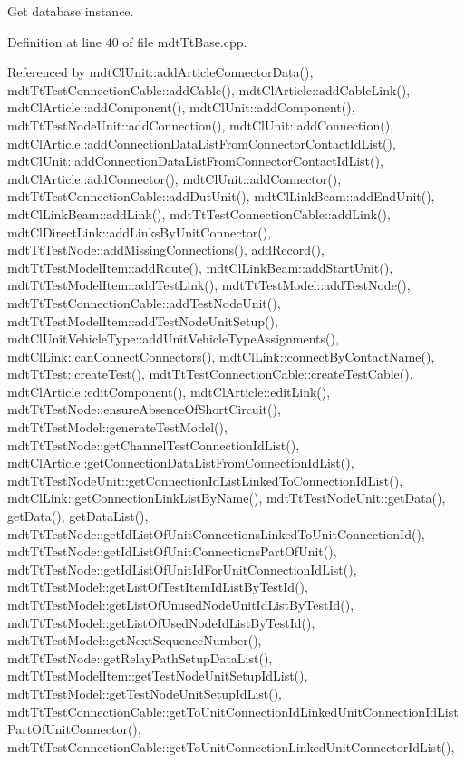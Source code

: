 Get database instance. 



Definition at line 40 of file mdt\-Tt\-Base.\-cpp.



Referenced by mdt\-Cl\-Unit\-::add\-Article\-Connector\-Data(), mdt\-Tt\-Test\-Connection\-Cable\-::add\-Cable(), mdt\-Cl\-Article\-::add\-Cable\-Link(), mdt\-Cl\-Article\-::add\-Component(), mdt\-Cl\-Unit\-::add\-Component(), mdt\-Tt\-Test\-Node\-Unit\-::add\-Connection(), mdt\-Cl\-Unit\-::add\-Connection(), mdt\-Cl\-Article\-::add\-Connection\-Data\-List\-From\-Connector\-Contact\-Id\-List(), mdt\-Cl\-Unit\-::add\-Connection\-Data\-List\-From\-Connector\-Contact\-Id\-List(), mdt\-Cl\-Article\-::add\-Connector(), mdt\-Cl\-Unit\-::add\-Connector(), mdt\-Tt\-Test\-Connection\-Cable\-::add\-Dut\-Unit(), mdt\-Cl\-Link\-Beam\-::add\-End\-Unit(), mdt\-Cl\-Link\-Beam\-::add\-Link(), mdt\-Tt\-Test\-Connection\-Cable\-::add\-Link(), mdt\-Cl\-Direct\-Link\-::add\-Links\-By\-Unit\-Connector(), mdt\-Tt\-Test\-Node\-::add\-Missing\-Connections(), add\-Record(), mdt\-Tt\-Test\-Model\-Item\-::add\-Route(), mdt\-Cl\-Link\-Beam\-::add\-Start\-Unit(), mdt\-Tt\-Test\-Model\-Item\-::add\-Test\-Link(), mdt\-Tt\-Test\-Model\-::add\-Test\-Node(), mdt\-Tt\-Test\-Connection\-Cable\-::add\-Test\-Node\-Unit(), mdt\-Tt\-Test\-Model\-Item\-::add\-Test\-Node\-Unit\-Setup(), mdt\-Cl\-Unit\-Vehicle\-Type\-::add\-Unit\-Vehicle\-Type\-Assignments(), mdt\-Cl\-Link\-::can\-Connect\-Connectors(), mdt\-Cl\-Link\-::connect\-By\-Contact\-Name(), mdt\-Tt\-Test\-::create\-Test(), mdt\-Tt\-Test\-Connection\-Cable\-::create\-Test\-Cable(), mdt\-Cl\-Article\-::edit\-Component(), mdt\-Cl\-Article\-::edit\-Link(), mdt\-Tt\-Test\-Node\-::ensure\-Absence\-Of\-Short\-Circuit(), mdt\-Tt\-Test\-Model\-::generate\-Test\-Model(), mdt\-Tt\-Test\-Node\-::get\-Channel\-Test\-Connection\-Id\-List(), mdt\-Cl\-Article\-::get\-Connection\-Data\-List\-From\-Connection\-Id\-List(), mdt\-Tt\-Test\-Node\-Unit\-::get\-Connection\-Id\-List\-Linked\-To\-Connection\-Id\-List(), mdt\-Cl\-Link\-::get\-Connection\-Link\-List\-By\-Name(), mdt\-Tt\-Test\-Node\-Unit\-::get\-Data(), get\-Data(), get\-Data\-List(), mdt\-Tt\-Test\-Node\-::get\-Id\-List\-Of\-Unit\-Connections\-Linked\-To\-Unit\-Connection\-Id(), mdt\-Tt\-Test\-Node\-::get\-Id\-List\-Of\-Unit\-Connections\-Part\-Of\-Unit(), mdt\-Tt\-Test\-Node\-::get\-Id\-List\-Of\-Unit\-Id\-For\-Unit\-Connection\-Id\-List(), mdt\-Tt\-Test\-Model\-::get\-List\-Of\-Test\-Item\-Id\-List\-By\-Test\-Id(), mdt\-Tt\-Test\-Model\-::get\-List\-Of\-Unused\-Node\-Unit\-Id\-List\-By\-Test\-Id(), mdt\-Tt\-Test\-Model\-::get\-List\-Of\-Used\-Node\-Id\-List\-By\-Test\-Id(), mdt\-Tt\-Test\-Model\-::get\-Next\-Sequence\-Number(), mdt\-Tt\-Test\-Node\-::get\-Relay\-Path\-Setup\-Data\-List(), mdt\-Tt\-Test\-Model\-Item\-::get\-Test\-Node\-Unit\-Setup\-Id\-List(), mdt\-Tt\-Test\-Model\-::get\-Test\-Node\-Unit\-Setup\-Id\-List(), mdt\-Tt\-Test\-Connection\-Cable\-::get\-To\-Unit\-Connection\-Id\-Linked\-Unit\-Connection\-Id\-List\-Part\-Of\-Unit\-Connector(), mdt\-Tt\-Test\-Connection\-Cable\-::get\-To\-Unit\-Connection\-Linked\-Unit\-Connector\-Id\-List(), 